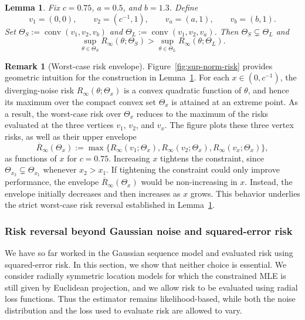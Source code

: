 \documentclass[11pt]{article}
\theoremstyle{plain}
\newtheorem{lemma}[theorem]{Lemma}
\theoremstyle{definition}
\newtheorem*{remark}{Remark}
\begin{document}
\begin{lemma}\label{lem:explicit-worst-case-risk}
Fix $c=0.75$, $a=0.5$, and $b=1.3$. Define
\[
v_1=(0,0), \qquad
v_2=(c^{-1},1), \qquad
v_a=(a,1), \qquad
v_b=(b,1).
\]
Set $\Theta_S:=\operatorname{conv}(v_1,v_2,v_b)$ and  $\Theta_L:=\operatorname{conv}(v_1,v_2,v_a)$. Then $\Theta_S \subsetneq \Theta_L$ and 
\[
\sup_{\theta\in\Theta_S} R_\infty(\theta;\Theta_S)
>
\sup_{\theta\in\Theta_L} R_\infty(\theta;\Theta_L).
\]
\end{lemma}

\begin{remark}[Worst-case risk envelope]
Figure~\ref{fig:sup-norm-risk} provides geometric intuition for the construction in
Lemma~\ref{lem:explicit-worst-case-risk}.
For each $x\in(0,c^{-1})$, the diverging-noise risk $R_\infty(\theta;\Theta_x)$ is a convex quadratic
function of $\theta$, and hence its maximum over the compact convex set $\Theta_x$
is attained at an extreme point.
As a result, the worst-case risk over $\Theta_x$ reduces to the maximum of the risks
evaluated at the three vertices $v_1$, $v_2$, and $v_x$. The figure plots these three vertex risks, as well as their upper envelope
\[
\overline{R}_\infty(\Theta_x)
:=
\max\{
R_\infty(v_1;\Theta_x),
R_\infty(v_2;\Theta_x),
R_\infty(v_x;\Theta_x)
\},
\]
as functions of $x$ for $c=0.75$.
Increasing $x$ tightens the constraint, since $\Theta_{x_2}\subsetneq \Theta_{x_1}$
whenever $x_2>x_1$.
If tightening the constraint could only improve performance, the envelope
$\overline{R}_\infty(\Theta_x)$ would be non-increasing in $x$. Instead, the envelope initially decreases and then increases as $x$ grows. This behavior underlies the strict worst-case risk reversal established in
Lemma~\ref{lem:explicit-worst-case-risk}.
\end{remark}


\subsubsection{Risk reversal beyond Gaussian noise and squared-error risk}
\label{ssec:beyondGaussianSqLoss}

We have so far worked in the Gaussian sequence model and evaluated risk using
squared-error risk. In this section, we show that neither choice is essential.
We consider radially symmetric location models for which the constrained MLE is
still given by Euclidean projection, and we allow risk to be evaluated using
radial loss functions. Thus the estimator remains likelihood-based, while both the
noise distribution and the loss used to evaluate risk are allowed to vary.
\end{document}
